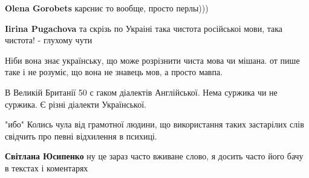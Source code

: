 \begin{itemize}
{\begin{itemize}
{\textbf{Olena Gorobets} карєниє то вообще, просто перлы)))

 
\textbf{Iirina Pugachova} та скрізь по Украіні така чистота російськоі мови, така чистота! - глухому чути
}\end{itemize}

 
Ніби вона знає українську, що може розрізнити чиста мова чи мішана.
от пише таке і не розуміє, що вона не знавець мов, а просто мавпа.

 
В Великій Британії 50 с гаком діалектів Англійської. Нема суржика чи не суржика. Є різні діалекти Української.

 
"ибо" Колись чула від грамотної людини, що використання таких застарілих слів свідчить про певні відхилення в психиці.

\begin{itemize}{
 
\textbf{Світлана Юсипенко} ну це зараз часто вживане слово, я досить часто його бачу в текстах і коментарях
}\end{itemize}

 
}
\end{itemize}

